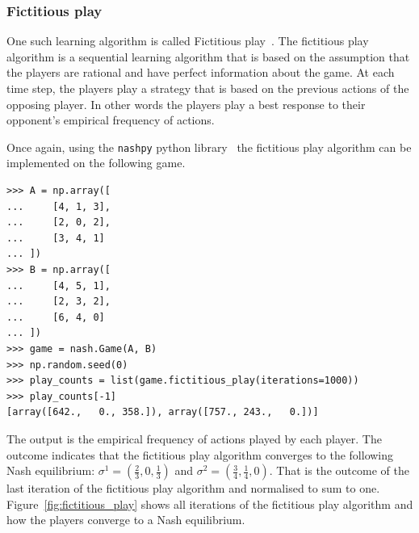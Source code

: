 \subsubsection{Fictitious play}
One such learning algorithm is called Fictitious play~\cite{brownfictitiousplay,
fudenberg1998theory}.
The fictitious play algorithm is a sequential learning algorithm that is
based on the assumption that the players are rational and have perfect
information about the game.
At each time step, the players play a strategy that is based on the
previous actions of the opposing player.
In other words the players play a best response to their opponent's
empirical frequency of actions.

Once again, using the \lstinline[style=pystyle]{nashpy} python
library~\cite{thenashpyproject} the fictitious play algorithm can be
implemented on the following game.

\begin{lstlisting}[style=pystyle]
>>> A = np.array([
...     [4, 1, 3],
...     [2, 0, 2],
...     [3, 4, 1]
... ])
>>> B = np.array([
...     [4, 5, 1],
...     [2, 3, 2],
...     [6, 4, 0]
... ])
>>> game = nash.Game(A, B)
>>> np.random.seed(0)
>>> play_counts = list(game.fictitious_play(iterations=1000))
>>> play_counts[-1]
[array([642.,   0., 358.]), array([757., 243.,   0.])]

\end{lstlisting}

The output is the empirical frequency of actions played by each player.
The outcome indicates that the fictitious play algorithm converges to the
following Nash equilibrium: \(\sigma^1 = (\frac{2}{3}, 0, \frac{1}{3})\) and
\(\sigma^2 = (\frac{3}{4}, \frac{1}{4}, 0)\).
That is the outcome of the last iteration of the fictitious play algorithm and
normalised to sum to one.
Figure~\ref{fig:fictitious_play} shows all iterations of the fictitious play
algorithm and how the players converge to a Nash equilibrium.

